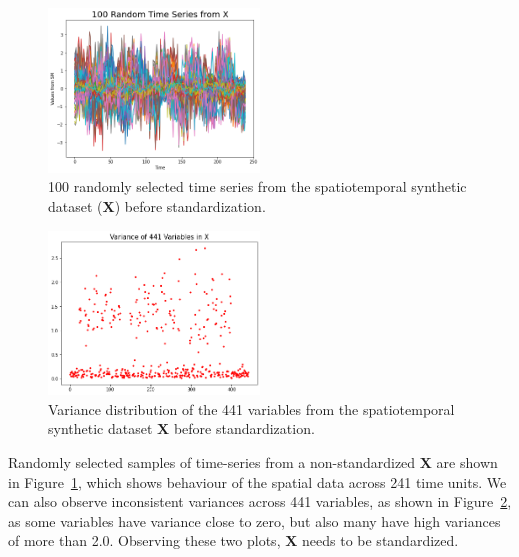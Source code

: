 \documentclass[11pt]{article}
\begin{document}
    \begin{figure}[H]
        \begin{center}
            \includegraphics[width=0.5\textwidth]{../plots/1_5_100_random_time_series}
        \caption{100 randomly selected time series from the spatiotemporal synthetic dataset ($\mathbf{X}$) before standardization.}
        \label{fig:100_timeseries}
        \end{center}
    \end{figure}

    \begin{figure}[H]
        \begin{center}
            \includegraphics[width=0.5\textwidth]{../plots/1_5_variance_distribution}
        \caption{Variance distribution of the 441 variables from the spatiotemporal synthetic dataset $\mathbf{X}$ before standardization.}
        \label{fig:vardist_X}
        \end{center}
    \end{figure}

Randomly selected samples of time-series from a non-standardized $\mathbf{X}$ are shown in Figure~\ref{fig:100_timeseries}, which shows behaviour of the spatial data across 241 time units. We can also observe inconsistent variances across 441 variables, as shown in Figure~\ref{fig:vardist_X}, as some variables have variance close to zero, but also many have high variances of more than 2.0. Observing these two plots, $\mathbf{X}$ needs to be standardized.
\end{document}

